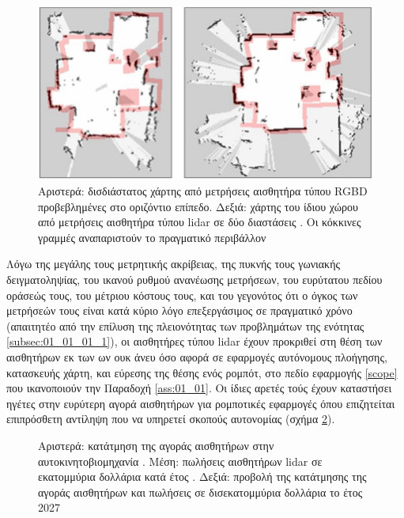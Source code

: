 \begin{figure}\centering
  \includegraphics[scale=0.5]{./figures/parts/01/chapters/01/sections/01/rgbd_lidar_map.png}
  \caption{\small Αριστερά: δισδιάστατος χάρτης από μετρήσεις αισθητήρα τύπου
           RGBD προβεβλημένες στο οριζόντιο επίπεδο. Δεξιά: χάρτης του ίδιου
           χώρου από μετρήσεις αισθητήρα τύπου lidar σε δύο διαστάσεις
           \cite{Oliver2012}. Οι κόκκινες γραμμές αναπαριστούν το πραγματικό
           περιβάλλον}
  \label{fig:rgbd_lidar_map}
\end{figure}

Λόγω της μεγάλης τους μετρητικής ακρίβειας, της πυκνής τους γωνιακής
δειγματοληψίας, του ικανού ρυθμού ανανέωσης μετρήσεων, του ευρύτατου πεδίου
οράσεώς τους, του μέτριου κόστους τους, και του γεγονότος ότι ο όγκος των
μετρήσεών τους είναι κατά κύριο λόγο επεξεργάσιμος σε πραγματικό χρόνο
(απαιτητέο από την επίλυση της πλειονότητας των προβλημάτων της ενότητας
\ref{subsec:01_01_01_1}), οι αισθητήρες τύπου lidar έχουν προκριθεί στη θέση
των αισθητήρων εκ των ων ουκ άνευ όσο αφορά σε εφαρμογές αυτόνομους πλοήγησης,
κατασκευής χάρτη, και εύρεσης της θέσης ενός ρομπότ, στο πεδίο εφαρμογής
\ref{scope} που ικανοποιούν την Παραδοχή \ref{ass:01_01}. Οι ίδιες αρετές τούς
έχουν καταστήσει ηγέτες στην ευρύτερη αγορά αισθητήρων για ρομποτικές εφαρμογές
όπου επιζητείται επιπρόσθετη αντίληψη που να υπηρετεί σκοπούς αυτονομίας (σχήμα
\ref{fig:lidar_share}).


\begin{figure}\centering
  
  \caption{\small Αριστερά: κατάτμηση της αγοράς αισθητήρων στην
           αυτοκινητοβιομηχανία \cite{Sighencea2021}. Μέση: πωλήσεις αισθητήρων
           lidar σε εκατομμύρια δολλάρια κατά έτος \cite{statista1}. Δεξιά:
           προβολή της κατάτμησης της αγοράς αισθητήρων και πωλήσεις σε
           δισεκατομμύρια δολλάρια το έτος 2027 \cite{statista2}}
  \label{fig:lidar_share}
\end{figure}


